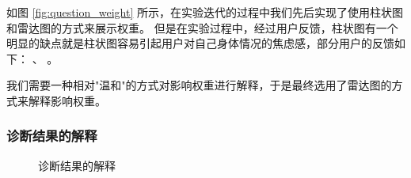 如图 \ref{fig:question_weight} 所示，在实验迭代的过程中我们先后实现了使用柱状图和雷达图的方式来展示权重。
但是在实验过程中，经过用户反馈，柱状图有一个明显的缺点就是柱状图容易引起用户对自己身体情况的焦虑感，部分用户的反馈如下：
、
。

我们需要一种相对"温和"的方式对影响权重进行解释，于是最终选用了雷达图的方式来解释影响权重。



\subsubsection{诊断结果的解释}
\begin{figure}[h]
    \centering
    \caption{诊断结果的解释}
    \label{fig:exp_result}
\end{figure}

